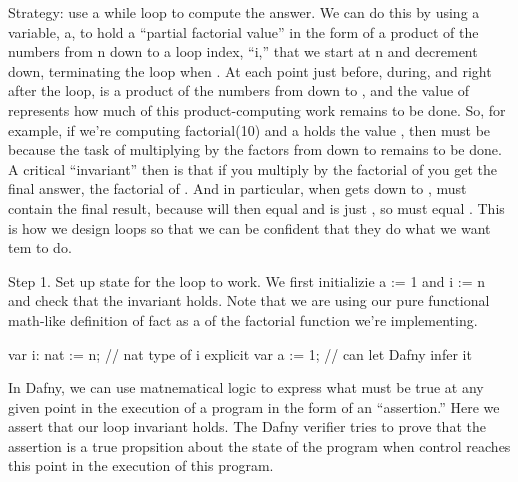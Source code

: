 \documentclass[letterpaper,10pt,english]{sphinxmanual}
\begin{document}
Strategy: use a while loop to compute the answer. We can do this by
using a variable, a, to hold a “partial factorial value” in the form
of a product of the numbers from n down to a loop index, “i,” that we
start at n and decrement down, terminating the loop when . At
each point just before, during, and right after the loop,  is a
product of the numbers from  down to , and the value of 
represents how much of this product-computing work remains to be
done. So, for example, if we’re computing factorial(10) and a holds
the value , then  must be  because the task of
multiplying  by the factors from  down to  remains to be
done. A critical “invariant” then is that if you multiply  by the
factorial of  you get the final answer, the factorial of .
And in particular, when  gets down to ,  must contain the
final result, because  will then equal  and
 is just , so  must equal . This is how we
design loops so that we can be confident that they do what we want
tem to do.

Step 1. Set up state for the loop to work. We first initializie a := 1
and i := n and check that the invariant holds. Note that we are using
our pure functional math-like definition of fact as a 
of the factorial function we’re implementing.

\begin{sphinxVerbatim}[commandchars=\\\{\}]
var i: nat := n;    // nat type of i explicit
var a := 1;         // can let Dafny infer it
\end{sphinxVerbatim}

In Dafny, we can use matnematical logic to express what must be true
at any given point in the execution of a program in the form of an
“assertion.” Here we assert that our loop invariant holds. The Dafny
verifier tries to prove that the assertion is a true propsition about
the state of the program when control reaches this point in the
execution of this program.
\end{document}
